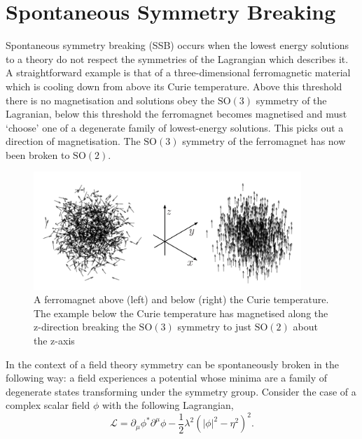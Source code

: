 \section{Spontaneous Symmetry Breaking}
Spontaneous symmetry breaking (SSB) occurs when the lowest energy solutions to a theory do not respect the symmetries of the Lagrangian which describes it. 
A straightforward example is that of a three-dimensional ferromagnetic material which is cooling down from above its Curie temperature.
Above this threshold there is no magnetisation and solutions obey the $\mathrm{SO}(3)$ symmetry of the Lagranian, 
below this threshold the ferromagnet becomes magnetised and must `choose' one of a degenerate family of lowest-energy solutions. This picks out a direction of magnetisation. The $\mathrm{SO}(3)$ symmetry of the ferromagnet has now been broken to $\mathrm{SO}(2)$.

\begin{figure}[h!]
\includegraphics[width=0.9\textwidth]{figures/theory/ferromagnet_ssb.pdf}
\caption{A ferromagnet above (left) and below (right) the Curie temperature. The example below the Curie temperature has magnetised along the z-direction breaking the $\mathrm{SO}(3)$ symmetry to just $\mathrm{SO}(2)$ about the z-axis}
\label{fig:theory:ferromagnet_ssb}
\end{figure}

In the context of a field theory symmetry can be spontaneously broken in the following way: a field experiences a potential whose minima are a family of degenerate states transforming under the symmetry group. 
Consider the case of a complex scalar field $\phi$ with the following Lagrangian,
\begin{equation}
    \label{eq:theory:global_SSB_L}
    \mathcal{L} = \partial_{\mu}\phi^{*}\partial^{\mu}\phi - \frac{1}{2}\lambda^{2}(|\phi|^{2} - \eta^{2})^{2}.
\end{equation}

